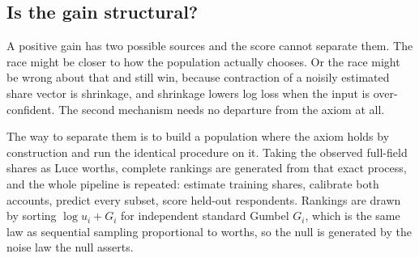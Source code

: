 \documentclass[11pt]{article}
\begin{document}
\subsection{Is the gain structural?}
\label{sec:null}

A positive gain has two possible sources and the score cannot separate them. The race
might be closer to how the population actually chooses. Or the race might be wrong
about that and still win, because contraction of a noisily estimated share vector is
shrinkage, and shrinkage lowers log loss when the input is over-confident. The second
mechanism needs no departure from the axiom at all.

The way to separate them is to build a population where the axiom holds by
construction and run the identical procedure on it. Taking the observed full-field
shares as Luce worths, complete rankings are generated from that exact process, and
the whole pipeline is repeated: estimate training shares, calibrate both accounts,
predict every subset, score held-out respondents. Rankings are drawn by sorting
$\log u_i + G_i$ for independent standard Gumbel $G_i$, which is the same law as
sequential sampling proportional to worths, so the null is generated by the noise law
the null asserts.
\end{document}
